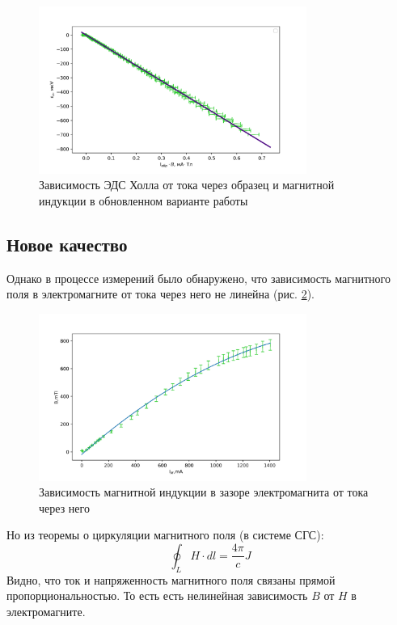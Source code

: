 \documentclass[a4paper,12pt]{article} %
\begin{document}
\begin{figure}[h!]
\begin{center}
\includegraphics[width=0.78\textwidth]{Chart}
\caption{Зависимость ЭДС Холла от тока через образец и магнитной индукции в обновленном варианте работы} \label{новый_график}
\end{center}
\end{figure}

\subsection*{Новое качество}
Однако в процессе измерений было обнаружено, что зависимость магнитного поля в электромагните от тока через него не линейна (рис. \ref{grad}).

\begin{figure}[h!]
\begin{center}
\includegraphics[width=0.78\textwidth]{Graduation_chart}
\caption{Зависимость магнитной индукции в зазоре электромагнита от тока через него} \label{grad}
\end{center}
\end{figure}
Но из теоремы о циркуляции магнитного поля (в системе СГС): 
\begin{equation}
\oint_L H \cdot dl =\frac{4\pi}{c}J
\end{equation}
Видно, что ток и напряженность магнитного поля связаны прямой пропорциональностью. То есть есть нелинейная зависимость $B$ от $H$ в электромагните. 
\end{document}
